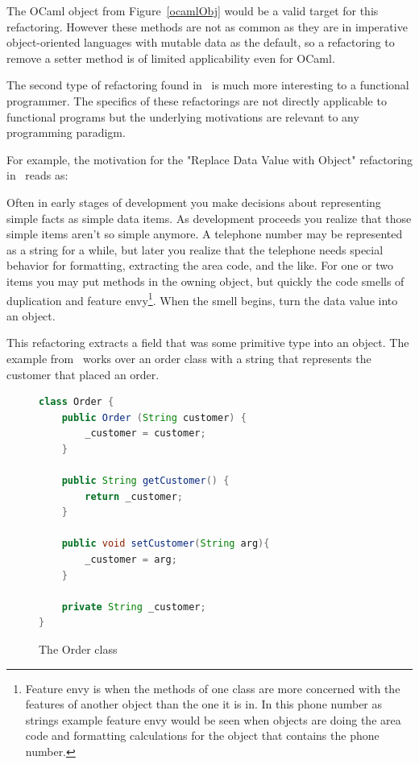 The OCaml object from Figure~\ref{ocamlObj} would be a valid target for this refactoring. However these methods are not as common as they are in imperative object-oriented languages with mutable data as the default, so a refactoring to remove a setter method is of limited applicability even for OCaml.

The second type of refactoring found in~\citep{fowler} is much more interesting to a functional programmer. The specifics of these refactorings are not directly applicable to functional programs but the underlying motivations are relevant to any programming paradigm. 

For example, the motivation for the "Replace Data Value with Object" refactoring in~\citep[pg. 175]{fowler} reads as:

\begin{displayquote}
Often in early stages of development you make decisions about representing simple facts as simple data items. As development proceeds you realize that those simple items aren't so simple anymore. A telephone number may be represented as a string for a while, but later you realize that the telephone needs special behavior for formatting, extracting the area code, and the like. For one or two items you may put methods in the owning object, but quickly the code smells of duplication and feature envy\footnote{Feature envy is when the methods of one class are more concerned with the features of another object than the one it is in. In this phone number as strings example feature envy would be seen when objects are doing the area code and formatting calculations for the object that contains the phone number.}. When the smell begins, turn the data value into an object.
\end{displayquote}

This refactoring extracts a field that was some primitive type into an object. The example from~\citep{fowler} works over an order class with a string that represents the customer that placed an order.

\begin{figure}[t]
\begin{lstlisting}[language = java,tabsize=4]
class Order {
	public Order (String customer) {
		_customer = customer;	
	}
	
	public String getCustomer() {
		return _customer;
	}
	
	public void setCustomer(String arg){
		_customer = arg;	
	}
	
	private String _customer;
}
\end{lstlisting}
\caption{The Order class}
\end{figure}

